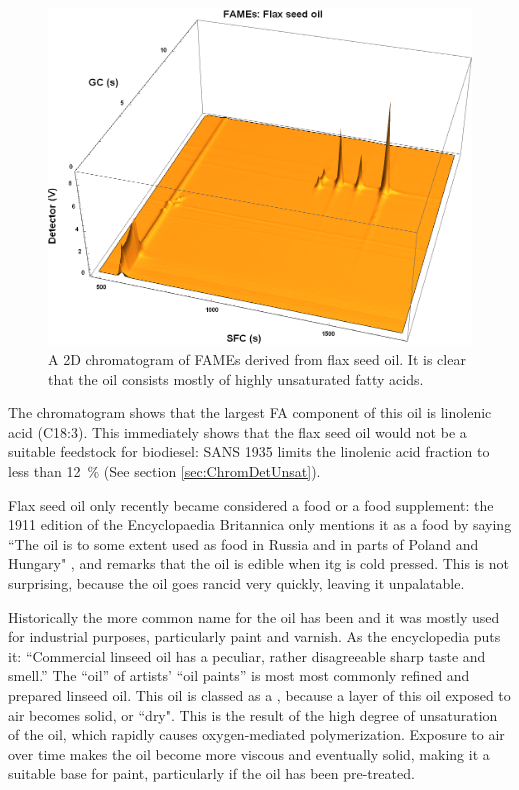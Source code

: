 \begin{figure}
\centering
\includegraphics[width=\textwidth]{Figures/Flax44.png}
\decoRule

\caption[SFC×GC of flax seed oil]{A 2D chromatogram of FAMEs derived from
flax seed oil. It is clear that the oil consists mostly of highly unsaturated fatty
acids.}

\label{fig:2DFlax}
\end{figure}

The chromatogram shows that the largest FA component of this oil is linolenic
acid (C18:3). This immediately shows that the flax seed oil would not be a
suitable feedstock for biodiesel: SANS 1935 limits the linolenic acid fraction
to less than \SI{12}{\percent} (See section \ref{sec:ChromDetUnsat}).

Flax seed oil only recently became considered a food or a food supplement: the
1911 edition of the Encyclopaedia Britannica only mentions it as a food by
saying ``The oil is to some extent used as food in Russia and in parts of Poland
and Hungary" \autocite{Linseed1911}, and remarks that the oil is edible when itg
is cold pressed. This is not surprising, because the oil goes rancid very
quickly, leaving it unpalatable.

Historically the more common name for the oil has been  and
it was mostly used for industrial purposes, particularly paint and varnish.
As the encyclopedia puts it: ``Commercial linseed oil has a peculiar, rather
disagreeable sharp taste and smell.'' The ``oil'' of artists' ``oil paints'' is
most most commonly refined and prepared linseed oil. This oil is classed as a
, because a layer of this oil exposed to air becomes solid,
or ``dry". This is the result of the high degree of unsaturation of the oil,
which rapidly causes oxygen-mediated polymerization. Exposure to air over time
makes the oil become more viscous and eventually solid, making it a suitable
base for paint, particularly if the oil has been pre-treated.

